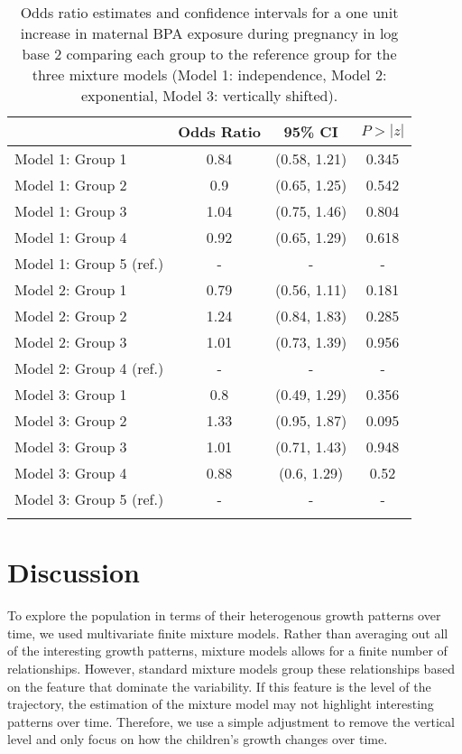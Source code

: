 \begin{table}[ht]
\centering 
\begin{tabular}{lccc}
  \thickhline
 & Odds Ratio & 95\% CI & $P>|z|$ \\ 
  \hline
Model 1: Group  1 & 0.84 & (0.58, 1.21) & 0.345 \\ 
  Model 1: Group  2 & 0.9 & (0.65, 1.25) & 0.542 \\ 
  Model 1: Group  3 & 1.04 & (0.75, 1.46) & 0.804 \\ 
  Model 1: Group  4 & 0.92 & (0.65, 1.29) & 0.618 \\ 
  Model 1: Group  5  (ref.) & - & - & - \\ 
  Model 2: Group  1 & 0.79 & (0.56, 1.11) & 0.181 \\ 
  Model 2: Group  2 & 1.24 & (0.84, 1.83) & 0.285 \\ 
  Model 2: Group  3 & 1.01 & (0.73, 1.39) & 0.956 \\ 
  Model 2: Group  4  (ref.) & - & - & - \\ 
  Model 3: Group  1 & 0.8 & (0.49, 1.29) & 0.356 \\ 
  Model 3: Group  2 & 1.33 & (0.95, 1.87) & 0.095 \\ 
  Model 3: Group  3 & 1.01 & (0.71, 1.43) & 0.948 \\ 
  Model 3: Group  4 & 0.88 & (0.6, 1.29) & 0.52 \\ 
  Model 3: Group  5  (ref.) & - & - & - \\ 
   \thickhline
\end{tabular}
\caption{Odds ratio estimates and confidence intervals for a one unit increase in maternal BPA exposure during pregnancy in log base 2 comparing each group to the reference group for the three mixture models (Model 1: independence, Model 2: exponential, Model 3: vertically shifted). }
\label{tab:6-2}
\end{table}

\section{Discussion}
To explore the population in terms of their heterogenous growth patterns over time, we used multivariate finite mixture models. Rather than averaging out all of the interesting growth patterns, mixture models allows for a finite number of relationships. However, standard mixture models group these relationships based on the feature that dominate the variability. If this feature is the level of the trajectory, the estimation of the mixture model may not highlight interesting patterns over time. Therefore, we use a simple adjustment to remove the vertical level and only focus on how the children's growth changes over time.

